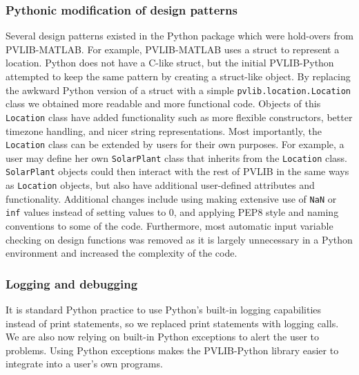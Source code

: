 \documentclass[conference]{IEEEtran}
\begin{document}
\subsubsection{Pythonic modification of design patterns}
Several design patterns existed in the Python package which were hold-overs from PVLIB-MATLAB. 
For example, PVLIB-MATLAB uses a struct to represent a location. 
Python does not have a C-like struct, but the initial PVLIB-Python attempted to keep the same pattern by creating a struct-like object.
By replacing the awkward Python version of a struct with a simple \texttt{pvlib.location.Location} class we obtained more readable and more functional code.
Objects of this \texttt{Location} class have added functionality such as more flexible constructors, better timezone handling, and nicer string representations.
Most importantly, the \texttt{Location} class can be extended by users for their own purposes.
For example, a user may define her own \texttt{SolarPlant} class that inherits from the \texttt{Location} class. 
\texttt{SolarPlant} objects could then interact with the rest of PVLIB in the same ways as \texttt{Location} objects, but also have additional user-defined attributes and functionality.
Additional changes include using making extensive use of \texttt{NaN} or \texttt{inf} values instead of setting values to 0, and applying PEP8 style and naming conventions \cite{pep8} to some of the code. 
Furthermore, most automatic input variable checking on design functions was removed as it is largely unnecessary in a Python environment and increased the complexity of the code. 

\subsubsection{Logging and debugging}
It is standard Python practice to use Python's built-in logging capabilities instead of print statements, so we replaced print statements with logging calls.
We are also now relying on built-in Python exceptions to alert the user to problems.
Using Python exceptions makes the PVLIB-Python library easier to integrate into a user's own programs.
\end{document}

